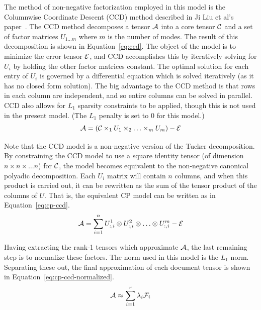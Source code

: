 \documentclass[../ut-dissertation.tex]{subfiles}
\begin{document}
The method of non-negative factorization employed in this model is the
Columnwise Coordinate Descent (CCD) method described in Ji Liu et al's
paper~\cite{liu2012sparse}. The CCD method decomposes a tensor
$\mathcal{A}$ into a
core tensor $\mathcal{C}$ and a set of factor matrices $U_{1\ldots m}$
where $m$ is the number of modes.  The result of this decomposition is
shown in Equation~\ref{eq:ccd}.  The object of the model is to
minimize the error tensor $\mathcal{E}$, and CCD accomplishes this by
iteratively solving for $U_i$ by holding the other factor matrices
constant.  The optimal solution for each entry of $U_i$ is governed by
a differential equation which is solved iteratively (as it has no
closed form solution).  The big advantage to the CCD method is that
rows in each column are independent, and so entire columns can be
solved in parallel.  CCD also allows for $L_1$ sparsity constraints to
be applied, though this is not used in the present model.  (The $L_1$
penalty is set to 0 for this model.)  
\begin{equation}
  \label{eq:ccd}
  \mathcal{A} = (\mathcal{C} \times_1 U_1 \times_2 \ldots \times_m U_m) - \mathcal{E}
\end{equation}

Note that the CCD model is a non-negative version of the Tucker
decomposition. By constraining the CCD model to use a square identity
tensor (of dimension $n \times n \times \ldots n$) for
$\mathcal{C}$, the model becomes equivalent to the non-negative canonical
polyadic decomposition.  Each $U_i$ matrix will contain $n$ columns,
and when this product is carried out, it can be rewritten as the sum
of the tensor product of the columns of $U$.  That is, the equivalent
CP model can be written as in Equation~\ref{eq:cp-ccd}.
\begin{equation}
  \label{eq:cp-ccd}
  \mathcal{A} = \displaystyle\sum_{i=1}^n U^1_{:,i} \otimes U^2_{:,i} \otimes \ldots
  \otimes U^m_{:,i} - \mathcal{E}
\end{equation}

Having extracting the rank-1 tensors which approximate $\mathcal{A}$, the
last remaining step is to normalize these factors.  The norm used in
this model is the $L_1$ norm.  Separating these out, the final
approximation of each document tensor is shown in
Equation~\ref{eq:cp-ccd-normalized}.
\begin{equation}
  \label{eq:cp-ccd-nromalized}
  \mathcal{A} \approx \displaystyle\sum_{i=1}^r \lambda_i \mathcal{F}_i
\end{equation}
\end{document}

